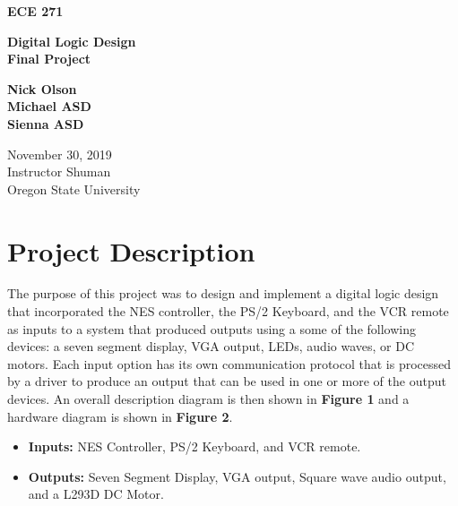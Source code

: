 \documentclass[a4paper]{article}
\begin{document}
\begin{titlepage}
 \begin{center}
  \vspace*{3cm}

  \large\textbf{ECE 271}

  \vspace{2cm}

  \huge\textbf{Digital Logic Design\\Final Project}

  \vspace{.5cm}

  \large\textbf{Nick Olson\\Michael ASD\\Sienna ASD}

  \vfill

  \normalsize November 30, 2019\\
  Instructor Shuman\\
  Oregon State University

  \vspace{0.8cm}
 \end{center}
\end{titlepage}



\tableofcontents
\listoffigures



\clearpage



\section{Project Description}
The purpose of this project was to design and implement a digital logic design that incorporated the NES controller, the PS/2 Keyboard, and the VCR remote as inputs to a system that produced outputs using a some of the following devices: a seven segment display, VGA output, LEDs, audio waves, or DC motors. Each input option has its own communication protocol that is processed by a driver to produce an output that can be used in one or more of the output devices. An overall description diagram is then shown in \textbf{Figure 1} and a hardware diagram is shown in \textbf{Figure 2}.

\begin{itemize}
  \item \textbf{Inputs:  } NES Controller, PS/2 Keyboard, and VCR remote.
  \item \textbf{Outputs: } Seven Segment Display, VGA output, Square wave audio output, and a L293D DC Motor.
\end{itemize}
\end{document}
